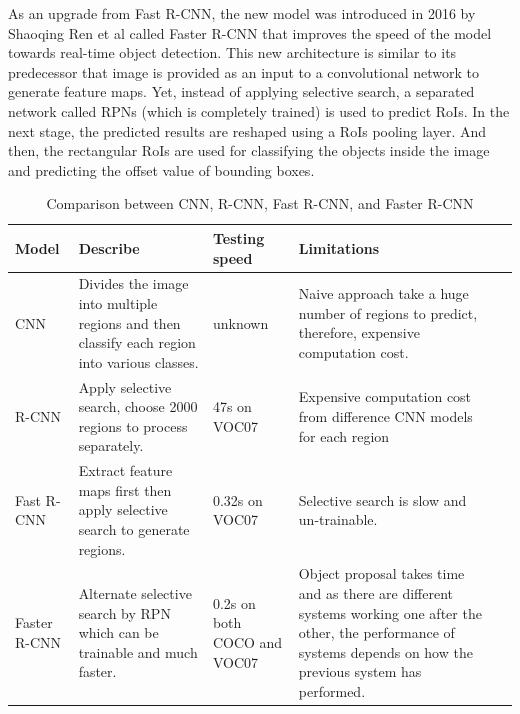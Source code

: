 	As an upgrade from Fast R-CNN, the new model was introduced in 2016 by Shaoqing Ren et al called Faster R-CNN that improves the speed of the model towards real-time object detection. This new architecture is similar to its predecessor that image is provided as an input to a convolutional network to generate feature maps. Yet, instead of applying selective search, a separated network called RPNs (which is completely trained) is used to predict RoIs. In the next stage, the predicted results are reshaped using a RoIs pooling layer. And then, the rectangular RoIs are used for classifying the objects inside the image and predicting the offset value of bounding boxes.
	
	\begin{table}
		\begin{tabularx}{1\textwidth} {
				| >{\raggedright\arraybackslash}X 
				| >{\raggedright\arraybackslash}X
				| >{\raggedright\arraybackslash}X 
				| >{\raggedright\arraybackslash}X  
				| >{\raggedright\arraybackslash}X | }
			\hline
			Model & Describe & Testing speed & Limitations \\
			\hline
			CNN & Divides the image into multiple regions and then classify each region into various classes.  & unknown & Naive approach take a huge number of regions to predict, therefore, expensive computation cost. \\
			\hline
			R-CNN & Apply selective search, choose 2000 regions to process separately.  & 47s on VOC07 & Expensive computation cost from difference CNN models for each region \\
			\hline
			Fast R-CNN & Extract feature maps first then apply selective search to generate regions.  & 0.32s on VOC07 & Selective search is slow and un-trainable. \\
			\hline
			Faster R-CNN & Alternate selective search by RPN which can be trainable and much faster.  & 0.2s on both COCO and VOC07 & Object proposal takes time and as there are different systems working one after the other, the performance of systems depends on how the previous system has performed. \\
			\hline
		\end{tabularx}
		\caption{Comparison between CNN, R-CNN, Fast R-CNN, and Faster R-CNN}
		\label{table:comparisonofrcnns}
	
	\end{table}
%		
	
